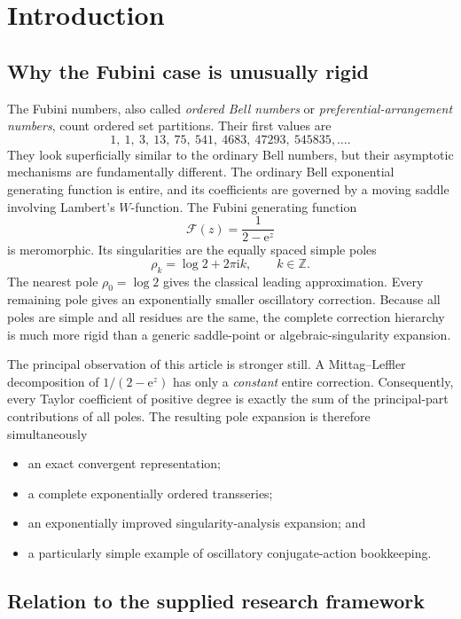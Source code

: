 \documentclass[11pt,oneside]{article}
\numberwithin{equation}{section}
\newcommand{\e}{\mathrm e}
\newcommand{\ii}{\mathrm i}
\newcommand{\Z}{\mathbb Z}
\begin{document}
\tableofcontents
\newpage
{}

\section{Introduction}

\subsection{Why the Fubini case is unusually rigid}

The Fubini numbers, also called \emph{ordered Bell numbers} or \emph{preferential-arrangement numbers}, count ordered set partitions.  Their first values are
\[
 1,\ 1,\ 3,\ 13,\ 75,\ 541,\ 4683,\ 47293,\ 545835,\ldots.
\]
They look superficially similar to the ordinary Bell numbers, but their asymptotic mechanisms are fundamentally different.  The ordinary Bell exponential generating function is entire, and its coefficients are governed by a moving saddle involving Lambert's \(W\)-function.  The Fubini generating function
\[
 \mathcal F(z)=\frac{1}{2-\e^z}
\]
is meromorphic.  Its singularities are the equally spaced simple poles
\[
 \rho_k=\log2+2\pi\ii k,\qquad k\in\Z.
\]
The nearest pole \(\rho_0=\log2\) gives the classical leading approximation.  Every remaining pole gives an exponentially smaller oscillatory correction.  Because all poles are simple and all residues are the same, the complete correction hierarchy is much more rigid than a generic saddle-point or algebraic-singularity expansion.

The principal observation of this article is stronger still.  A Mittag--Leffler decomposition of \(1/(2-\e^z)\) has only a \emph{constant} entire correction.  Consequently, every Taylor coefficient of positive degree is exactly the sum of the principal-part contributions of all poles.  The resulting pole expansion is therefore simultaneously
\begin{itemize}
 \item an exact convergent representation;
 \item a complete exponentially ordered transseries;
 \item an exponentially improved singularity-analysis expansion; and
 \item a particularly simple example of oscillatory conjugate-action bookkeeping.
\end{itemize}

\subsection{Relation to the supplied research framework}
\end{document}

